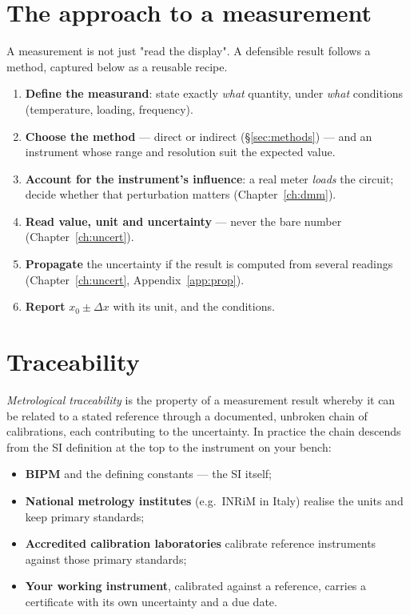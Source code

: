 \documentclass[11pt,a4paper,oneside]{book}
\begin{document}
\section{The approach to a measurement}\label{sec:approach}

A measurement is not just "read the display". A defensible result follows a
method, captured below as a reusable recipe.

\begin{protocol}
\begin{enumerate}[leftmargin=1.5cm]
  \item \textbf{Define the measurand}: state exactly \emph{what} quantity, under
        \emph{what} conditions (temperature, loading, frequency).
  \item \textbf{Choose the method} --- direct or indirect
        (\S\ref{sec:methods}) --- and an instrument whose range and resolution
        suit the expected value.
  \item \textbf{Account for the instrument's influence}: a real meter \emph{loads}
        the circuit; decide whether that perturbation matters
        (Chapter~\ref{ch:dmm}).
  \item \textbf{Read value, unit and uncertainty} --- never the bare number
        (Chapter~\ref{ch:uncert}).
  \item \textbf{Propagate} the uncertainty if the result is computed from several
        readings (Chapter~\ref{ch:uncert}, Appendix~\ref{app:prop}).
  \item \textbf{Report} $x_0\pm\Delta x$ with its unit, and the conditions.
\end{enumerate}
\end{protocol}

\section{Traceability}\label{sec:trace}

\emph{Metrological traceability} is the property of a measurement result whereby it
can be related to a stated reference through a documented, unbroken chain of
calibrations, each contributing to the uncertainty. In practice the chain descends
from the SI definition at the top to the instrument on your bench:

\begin{itemize}[leftmargin=1.4cm,itemsep=1pt]
  \item \textbf{BIPM} and the defining constants --- the SI itself;
  \item \textbf{National metrology institutes} (e.g.\ INRiM in Italy) realise the
        units and keep primary standards;
  \item \textbf{Accredited calibration laboratories} calibrate reference
        instruments against those primary standards;
  \item \textbf{Your working instrument}, calibrated against a reference, carries a
        certificate with its own uncertainty and a due date.
\end{itemize}
\end{document}
